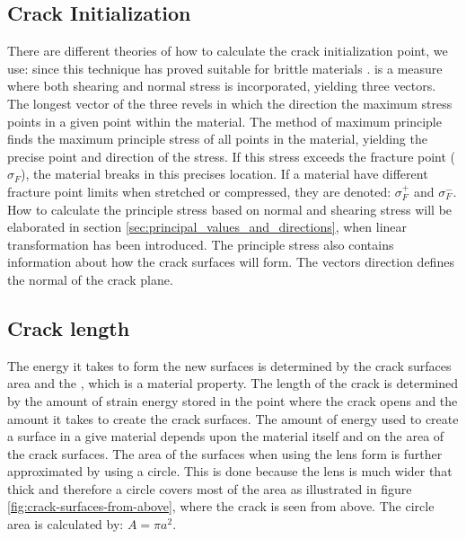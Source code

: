 \subsection{Crack Initialization}
\label{sec:physics_crack_init}
There are different theories of how to calculate the crack
initialization point, we use:  since this
technique has proved suitable for brittle materials
.
%
 is a measure where both shearing and normal
stress is incorporated, yielding three vectors. The longest vector of
the three revels in which the direction the maximum stress points in a
given point within the material. The method of maximum principle finds
the maximum principle stress of all points in the material, yielding
the precise point and direction of the stress.
%
If this stress exceeds the fracture point ($\sigma_F$), the material
breaks in this precises location. If a material have different
fracture point limits when stretched or compressed, they are
denoted: $\sigma_F^+$ and $\sigma_F^-$.
% 
How to calculate the principle stress based on normal and shearing
stress will be elaborated in section
\vref{sec:principal_values_and_directions}, when linear transformation
has been introduced.
%
The principle stress also contains information about how the crack
surfaces will form. The vectors direction defines the normal of the
crack plane.

\subsection{Crack length}
The energy it takes to form the new surfaces is determined by the
crack surfaces area and the , which
is a material property.
The length of the crack is determined by the amount of strain energy
stored in the point where the crack opens and the amount it takes to
create the crack surfaces. The amount of energy used to create a
surface in a give material depends upon the material itself and on
the area of the crack surfaces. The area of the surfaces when using
the lens form is further approximated by using a circle. This is done
because the lens is much wider that thick and therefore a circle
covers most of the area as illustrated in figure
\vref{fig:crack-surfaces-from-above}, where the crack is seen from
above. The circle area is calculated by: $A = \pi a^2$.


